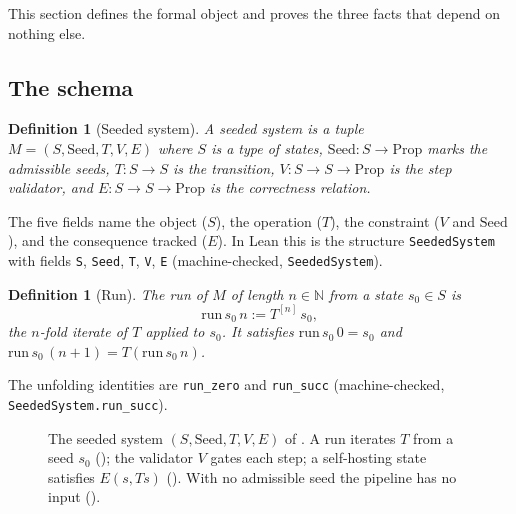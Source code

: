 \documentclass[11pt,a4paper]{article}
\newtheorem{definition}[theorem]{Definition}
\newcommand{\Nat}{\mathbb{N}}
\newcommand{\Seed}{\mathrm{Seed}}
\newcommand{\run}{\mathrm{run}}
\begin{document}
This section defines the formal object and proves the three facts that depend
on nothing else.

\subsection{The schema}

\begin{definition}[Seeded system]
\label{def:seeded}
A \emph{seeded system} is a tuple $M = (S, \Seed, T, V, E)$ where
$S$ is a type of states,
$\Seed : S \to \mathrm{Prop}$ marks the admissible seeds,
$T : S \to S$ is the transition,
$V : S \to S \to \mathrm{Prop}$ is the step validator, and
$E : S \to S \to \mathrm{Prop}$ is the correctness relation.
\end{definition}

The five fields name the object ($S$), the operation ($T$), the constraint
($V$ and $\Seed$), and the consequence tracked ($E$).
In Lean this is the structure \texttt{SeededSystem} with fields \texttt{S},
\texttt{Seed}, \texttt{T}, \texttt{V}, \texttt{E}
(machine-checked, \texttt{SeededSystem}).

\begin{definition}[Run]
\label{def:run}
The \emph{run} of $M$ of length $n \in \Nat$ from a state $s_0 \in S$ is
\[
  \run\,s_0\,n := T^{[n]}\,s_0,
\]
the $n$-fold iterate of $T$ applied to $s_0$.
It satisfies $\run\,s_0\,0 = s_0$ and
$\run\,s_0\,(n+1) = T(\run\,s_0\,n)$.
\end{definition}

The unfolding identities are \texttt{run\_zero} and \texttt{run\_succ}
(machine-checked, \texttt{SeededSystem.run\_succ}).

\begin{figure}[t]
\centering
{}
\caption{The seeded system $(S, \Seed, T, V, E)$ of .
A run iterates $T$ from a seed $s_0$ (); the validator $V$ gates
each step; a self-hosting state satisfies $E(s, T s)$ ().
With no admissible seed the pipeline has no input ().}
\label{fig:schema}
\end{figure}
\end{document}
